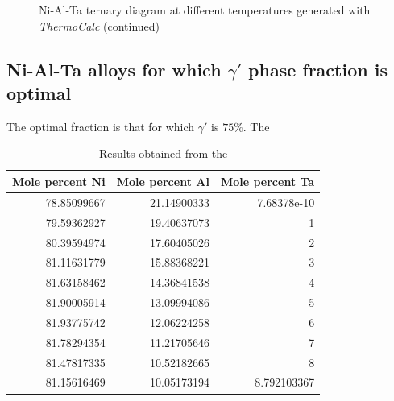 \begin{figure}[H]
{    }
  \caption[]{\centering Ni-Al-Ta ternary diagram at different temperatures generated with \textit{ThermoCalc} \citep{thermocalc} (continued)}
\end{figure}



\newpage
\subsection{Ni-Al-Ta alloys for which $\gamma'$ phase fraction is optimal}

The optimal fraction is that for which $\gamma'$ is $75\%$. The 

\begin{table}[h]
  \centering
    \begin{tabular}{rrr}
        \multicolumn{1}{c}{\textbf{Mole percent Ni}} & \multicolumn{1}{c}{\textbf{Mole percent Al}} & \multicolumn{1}{c}{\textbf{Mole percent Ta}} \\ \hline \hline
        78.85099667 & 21.14900333 & 7.68378e-10 \\
        79.59362927 & 19.40637073 & 1 \\
        80.39594974 & 17.60405026 & 2 \\
        81.11631779 & 15.88368221 & 3 \\
        81.63158462 & 14.36841538 & 4 \\
        81.90005914 & 13.09994086 & 5 \\
        81.93775742 & 12.06224258 & 6 \\
        81.78294354 & 11.21705646 & 7 \\
        81.47817335 & 10.52182665 & 8 \\
        81.15616469 & 10.05173194 & 8.792103367
    \end{tabular}
  \caption{Results obtained from the }
  \label{tab:tab02}
\end{table}

